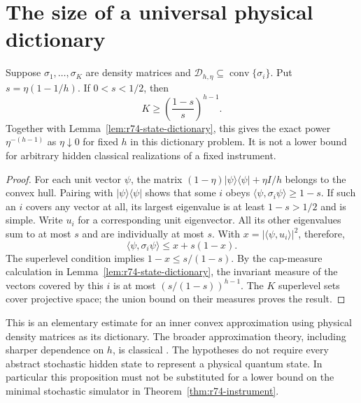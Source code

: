 \section{The size of a universal physical dictionary}
\label{sec:r74-dictionary-lower}

\begin{proposition}
\label{prop:r74-dictionary-lower}
Suppose $\sigma_1,\ldots,\sigma_K$ are density matrices and
$\mathcal D_{h,\eta}\subseteq\operatorname{conv}\{\sigma_i\}$.
Put $s=\eta(1-1/h)$. If $0<s<1/2$, then
\[
 K\ge\left(\frac{1-s}{s}\right)^{h-1}.
\]
Together with Lemma~\ref{lem:r74-state-dictionary}, this gives the exact
power $\eta^{-(h-1)}$ as $\eta\downarrow0$ for fixed $h$ in this
dictionary problem. It is not a lower bound for arbitrary hidden classical
realizations of a fixed instrument.
\end{proposition}
\begin{proof}
For each unit vector $\psi$, the matrix
$(1-\eta)|\psi\rangle\langle\psi|+\eta I/h$ belongs to the convex hull.
Pairing with $|\psi\rangle\langle\psi|$ shows that some $i$ obeys
$\langle\psi,\sigma_i\psi\rangle\ge1-s$.
If such an $i$ covers any vector at all, its largest eigenvalue is at least
$1-s>1/2$ and is simple. Write $u_i$ for a corresponding unit eigenvector.
All its other eigenvalues sum to at most $s$ and are individually at most
$s$. With $x=|\langle\psi,u_i\rangle|^2$, therefore,
\[
 \langle\psi,\sigma_i\psi\rangle\le x+s(1-x).
\]
The superlevel condition implies $1-x\le s/(1-s)$.
By the cap-measure calculation in Lemma~\ref{lem:r74-state-dictionary},
the invariant measure of the vectors covered by this $i$ is at most
$(s/(1-s))^{h-1}$. The $K$ superlevel sets cover projective space; the
union bound on their measures proves the result.
\end{proof}

This is an elementary estimate for an inner convex approximation using
physical density matrices as its dictionary. The broader approximation
theory, including sharper dependence on $h$, is classical
\cite{AubrunSzarek17}. The hypotheses do not require every abstract stochastic
hidden state to represent a physical quantum state. In particular this
proposition must not be substituted for a lower bound on the minimal
stochastic simulator in Theorem~\ref{thm:r74-instrument}.
